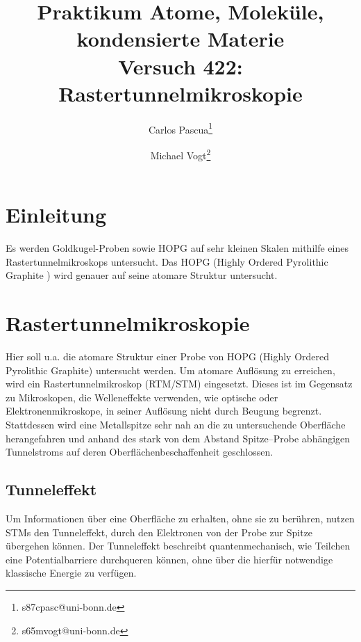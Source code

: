 \documentclass{article}
\title{Praktikum Atome, Moleküle, kondensierte Materie \\ Versuch 422: Rastertunnelmikroskopie}
\author[1]{Carlos Pascua\thanks{s87cpasc@uni-bonn.de}}
\author[1]{Michael Vogt\thanks{s65mvogt@uni-bonn.de}}
\affil[1]{Uni Bonn}
\newcommand{\defc}{black}
\newcommand{\colorT}[2][blue]{\color{#1}{#2}\color{\defc}}
\newcommand{\todo}[1]{\colorT[red]{\textbf{(#1)}}}
\begin{document}
\maketitle
\tableofcontents
\newpage
{}

\pagestyle{fancy}
\fancyhead[R]{\thepage}
\fancyhead[L]{\leftmark}

\section*{Einleitung}
Es werden Goldkugel-Proben sowie HOPG auf sehr kleinen Skalen mithilfe eines Rastertunnelmikroskops untersucht.
Das HOPG (Highly Ordered Pyrolithic Graphite \cite{Anleitung}) wird genauer auf seine atomare Struktur untersucht.

\section{Rastertunnelmikroskopie}
Hier soll u.a. die atomare Struktur einer Probe von HOPG (Highly Ordered Pyrolithic Graphite) untersucht werden.
Um atomare Auflösung zu erreichen, wird ein Rastertunnelmikroskop (RTM/STM) eingesetzt.
Dieses ist im Gegensatz zu Mikroskopen, die Welleneffekte verwenden, wie optische oder Elektronenmikroskope,
in seiner Auflösung nicht durch Beugung begrenzt.
Stattdessen wird eine Metallspitze sehr nah an die zu untersuchende Oberfläche 
herangefahren und anhand des stark von dem Abstand Spitze--Probe abhängigen Tunnelstroms auf deren Oberflächenbeschaffenheit geschlossen.


\subsection*{Tunneleffekt} 
Um Informationen über eine Oberfläche zu erhalten, ohne sie zu berühren, nutzen STMs den
Tunneleffekt, durch den Elektronen von der Probe zur Spitze übergehen können.
Der Tunneleffekt beschreibt quantenmechanisch, wie Teilchen eine Potentialbarriere durchqueren können, ohne über die hierfür notwendige klassische Energie zu verfügen.
\end{document}
